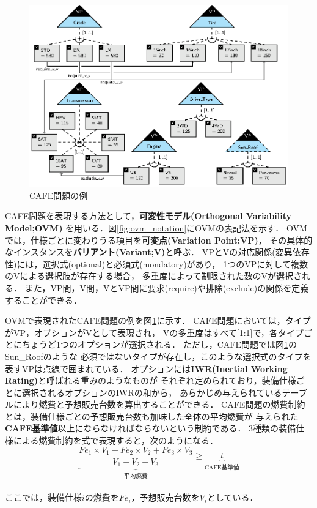 \begin{figure}[t]
 \centerline {\includegraphics[width=\linewidth]{images/ovm_example.eps}}
 \caption{CAFE問題の例}
 \label{fig:ovm_example}
\end{figure}

CAFE問題を表現する方法として，\textbf{可変性モデル(Orthogonal Variability Model;OVM)}
\cite{Pohl05:sple}を用いる．図\ref{fig:ovm_notation}にOVMの表記法を示す．
OVMでは，仕様ごとに変わりうる項目を\textbf{可変点(Variation Point;VP)}，
その具体的なインスタンスを\textbf{バリアント(Variant;V)}と呼ぶ．
VPとVの対応関係(変異依存性)には，選択式(optional)と必須式(mondatory)があり，
1つのVPに対して複数のVによる選択肢が存在する場合，
多重度によって制限された数のVが選択される．
また，VP間，V間，VとVP間に要求(require)や排除(exclude)の関係を定義することができる．



OVMで表現されたCAFE問題の例を図\ref{fig:ovm_example}に示す．
CAFE問題においては，タイプがVP，オプションがVとして表現され，
Vの多重度はすべて[1:1]で，各タイプごとにちょうど1つのオプションが選択される．
ただし，CAFE問題では図\ref{fig:ovm_example}のSun\_Roofのような
必須ではないタイプが存在し，このような選択式のタイプを表すVPは点線で囲まれている．
オプションには\textbf{IWR(Inertial Working Rating)}と呼ばれる重みのようなものが
それぞれ定められており，装備仕様ごとに選択されるオプションのIWRの和から，
あらかじめ与えられているテーブルにより燃費と予想販売台数を算出することができる．
CAFE問題の燃費制約とは，装備仕様ごとの予想販売台数も加味した全体の平均燃費が
与えられた\textbf{CAFE基準値}以上にならなければならないという制約である．
3種類の装備仕様による燃費制約を式で表現すると，次のようになる．
\vspace{1em}
 \begin{displaymath}
   \underbrace{
   \frac{Fe_{1} \times V_1 + Fe_{2} \times V_2 + Fe_{3} \times V_3 }{V_1 + V_2 + V_3}
   }_{\mbox{平均燃費}}
   \geq 
   \underbrace{t}_{\mbox{CAFE基準値}}
  \end{displaymath}
\vspace{1em}\\
ここでは，装備仕様$i$の燃費を$Fe_i$，予想販売台数を$V_i$としている．

